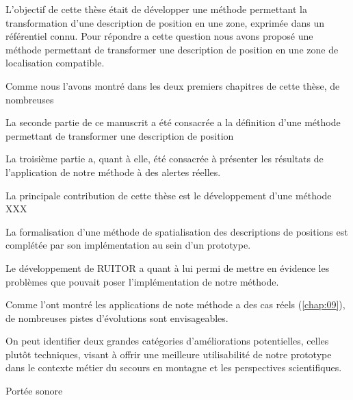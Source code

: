 
L'objectif de cette thèse était de développer une méthode permettant
la transformation d'une description de position en une zone, exprimée
dans un référentiel connu.
%
Pour répondre a cette question nous avons proposé une méthode
permettant de transformer une description de position en une zone de
localisation compatible.



Comme nous l'avons montré dans les deux premiers chapitres de cette
thèse, de nombreuses

La seconde partie de ce manuscrit a été consacrée a la définition
d'une méthode permettant de transformer une description de position



La troisième partie a, quant à elle, été consacrée à présenter les
résultats de l’application de notre méthode à des alertes
réelles. 




La principale contribution de cette thèse est le développement d'une
méthode XXX




La formalisation d'une méthode de spatialisation des descriptions de
positions est complétée par son implémentation au sein d'un prototype.





Le développement de RUITOR a quant à lui permi de mettre en évidence
les problèmes que pouvait poser l'implémentation de notre méthode.


Comme l'ont montré les applications de note méthode a des cas réels
(\autoref{chap:09}), de nombreuses pistes d'évolutions sont
envisageables.

On peut identifier deux grandes catégories d'améliorations
potentielles, celles plutôt techniques, visant à offrir une meilleure
utilisabilité de notre prototype dans le contexte métier du secours en
montagne et les perspectives scientifiques.


Portée sonore

